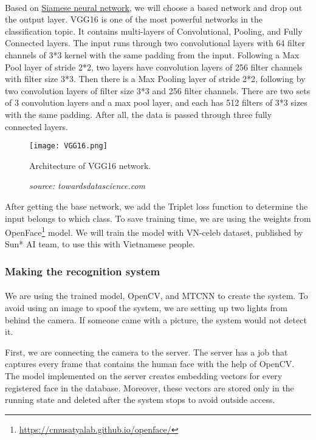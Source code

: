 \paragraph{}
Based on \hyperref[sec:siamese]{Siamese neural network}, we will choose a based network and drop out the output layer. VGG16 is one of the most powerful networks in the classification topic. It contains multi-layers of Convolutional, Pooling, and Fully Connected layers. The input runs through two convolutional layers with 64 filter channels of 3*3 kernel with the same padding from the input. Following a Max Pool layer of stride 2*2, two layers have convolution layers of 256 filter channels with filter size 3*3. Then there is a Max Pooling layer of stride 2*2, following by two convolution layers of filter size 3*3 and 256 filter channels. There are two sets of 3 convolution layers and a max pool layer, and each has 512 filters of 3*3 sizes with the same padding. After all, the data is passed through three fully connected layers.

\begin{figure}[H]
    \centering
    \texttt{[image: VGG16.png]}
    \caption{Architecture of VGG16 network.}
    \caption*{\textit{source: towardsdatascience.com}}
    \label{fig:VGG16}
\end{figure}

After getting the base network, we add the Triplet loss function to determine the input belongs to which class. To save training time, we are using the weights from OpenFace\footnote{\url{https://cmusatyalab.github.io/openface/}} model. We will train the model with VN-celeb dataset, published by Sun* AI team, to use this with Vietnamese people.

\subsubsection{Making the recognition system}
\paragraph{}
We are using the trained model, OpenCV, and MTCNN to create the system. To avoid using an image to spoof the system, we are setting up two lights from behind the camera. If someone came with a picture, the system would not detect it.

First, we are connecting the camera to the server. The server has a job that captures every frame that contains the human face with the help of OpenCV. The model implemented on the server creates embedding vectors for every registered face in the database. Moreover, these vectors are stored only in the running state and deleted after the system stops to avoid outside access.

